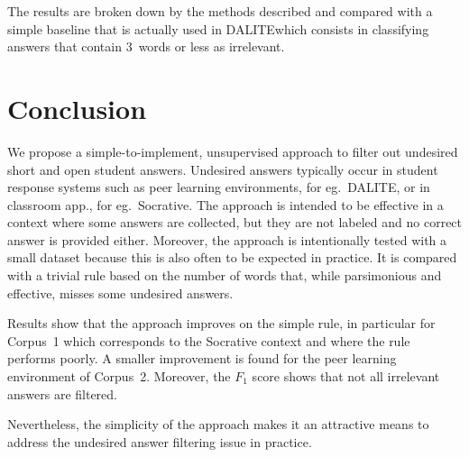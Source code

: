 \documentclass{edm_template}
\newcommand{\dalite}{DALITE}
\begin{document}
The results are broken down by the methods described and compared with a simple baseline that is actually used in \dalite which consists in classifying answers that contain 3~words or less as irrelevant.




\section{Conclusion}

We propose a simple-to-implement, unsupervised approach to filter out undesired short and open student answers.  Undesired answers typically occur in student response systems such as peer learning environments, for eg.~\dalite, or in classroom app., for eg.~Socrative.  The approach is intended to be effective in a context where some answers are collected, but they are not labeled and no correct answer is provided either.  Moreover, the approach is intentionally tested with a small dataset because this is also often to be expected in practice.  It is compared with a trivial rule based on the number of words that, while parsimonious and effective, misses some undesired answers.

Results show that the approach improves on the simple rule, in particular for Corpus~1 which corresponds to the Socrative context and where the rule performs poorly.  A smaller improvement is found for the peer learning environment of Corpus~2.  Moreover, the $F_1$ score shows that not all irrelevant answers are filtered.

Nevertheless, the simplicity of the approach makes it an attractive means to address the undesired answer filtering issue in practice.
\vfill


\end{document}

